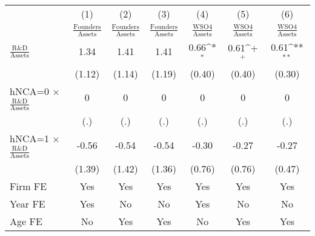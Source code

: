 {
\def\sym#1{\ifmmode^{#1}\else\(^{#1}\)\fi}
\begin{tabular}{l*{6}{c}}
\toprule
                    &\multicolumn{1}{c}{(1)}&\multicolumn{1}{c}{(2)}&\multicolumn{1}{c}{(3)}&\multicolumn{1}{c}{(4)}&\multicolumn{1}{c}{(5)}&\multicolumn{1}{c}{(6)}\\
                    &\multicolumn{1}{c}{$\frac{\textrm{Founders}}{\textrm{Assets}}$}&\multicolumn{1}{c}{$\frac{\textrm{Founders}}{\textrm{Assets}}$}&\multicolumn{1}{c}{$\frac{\textrm{Founders}}{\textrm{Assets}}$}&\multicolumn{1}{c}{$\frac{\textrm{WSO4}}{\textrm{Assets}}$}&\multicolumn{1}{c}{$\frac{\textrm{WSO4}}{\textrm{Assets}}$}&\multicolumn{1}{c}{$\frac{\textrm{WSO4}}{\textrm{Assets}}$}\\
\midrule
$\frac{\textrm{R\&D}}{\textrm{Assets}}$&        1.34         &        1.41         &        1.41         &        0.66\sym{*}  &        0.61\sym{+}  &        0.61\sym{**} \\
                    &      (1.12)         &      (1.14)         &      (1.19)         &      (0.40)         &      (0.40)         &      (0.30)         \\
\addlinespace
hNCA=0 $\times$ $\frac{\textrm{R\&D}}{\textrm{Assets}}$&           0         &           0         &           0         &           0         &           0         &           0         \\
                    &         (.)         &         (.)         &         (.)         &         (.)         &         (.)         &         (.)         \\
\addlinespace
hNCA=1 $\times$ $\frac{\textrm{R\&D}}{\textrm{Assets}}$&       -0.56         &       -0.54         &       -0.54         &       -0.30         &       -0.27         &       -0.27         \\
                    &      (1.39)         &      (1.42)         &      (1.36)         &      (0.76)         &      (0.76)         &      (0.47)         \\
\addlinespace
Firm FE             &         Yes         &         Yes         &         Yes         &         Yes         &         Yes         &         Yes         \\
\addlinespace
Year FE             &         Yes         &          No         &          No         &         Yes         &          No         &          No         \\
\addlinespace
Age FE              &          No         &         Yes         &         Yes         &          No         &         Yes         &         Yes         \\

\end{tabular}}
